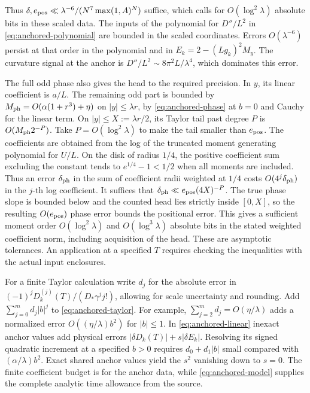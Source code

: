 Thus \(\delta,e_{\rm pos}\ll\lambda^{-6}/(N^7\max(1,A)^N)\) suffice,
which calls for \(O(\log^2\lambda)\) absolute bits in these scaled data.
The inputs of the polynomial for \(D''/L^2\) in
\eqref{eq:anchored-polynomial} are bounded in the scaled coordinates.
Errors \(O(\lambda^{-6})\) persist at that order in the polynomial and in
\(E_k=2-(Lg_k)^2M_y\). The curvature signal at the anchor is
\(D''/L^2\sim8\pi^2L/\lambda^4\), which dominates this error.

The full odd phase also gives the head to the required precision. In
\(y\), its linear coefficient is \(a/L\). The remaining odd part is bounded
by \(M_{\rm ph}=O(\alpha(1+r^3)+\eta)\) on \(|y|\le\lambda r\), by
\eqref{eq:anchored-phase} at \(b=0\) and Cauchy for the linear term.
On \(|y|\le X:=\lambda r/2\), its Taylor tail past degree \(P\) is
\(O(M_{\rm ph}2^{-P})\). Take \(P=O(\log^2\lambda)\) to make the tail
smaller than \(e_{\rm pos}\). The coefficients are obtained from the log
of the truncated moment generating polynomial for \(U/L\). On the disk
of radius \(1/4\), the positive coefficient sum excluding the constant
tends to \(e^{1/4}-1<1/2\) when all moments are included. Thus an error
\(\delta_{\rm ph}\) in the sum of coefficient radii weighted at \(1/4\)
costs \(O(4^j\delta_{\rm ph})\) in the \(j\)-th log coefficient. It suffices
that \(\delta_{\rm ph}\ll e_{\rm pos}(4X)^{-P}\). The true phase slope
is bounded below and the counted head lies strictly inside \([0,X]\), so
the resulting \(O(e_{\rm pos})\) phase error bounds the positional error.
This gives a sufficient moment order \(O(\log^2\lambda)\) and
\(O(\log^3\lambda)\) absolute bits in the stated weighted coefficient norm,
including acquisition of the head. These are asymptotic tolerances.
An application at a specified \(T\) requires checking the inequalities
with the actual input enclosures.

For a finite Taylor calculation write \(d_j\) for the absolute error
in \((-1)^j D_k^{(j)}(T)/(D_*\gamma^j j!)\), allowing for scale uncertainty
and rounding. Add \(\sum_{j=0}^m d_j|b|^j\) to \eqref{eq:anchored-taylor}.
For example, \(\sum_{j=2}^m d_j=O(\eta/\lambda)\) adds a normalized
error \(O((\eta/\lambda)b^2)\) for \(|b|\le1\).
In \eqref{eq:anchored-linear} inexact anchor values add physical errors
\(|\delta D_k(T)|+s|\delta E_k|\). Resolving its signed quadratic increment
at a specified \(b>0\) requires \(d_0+d_1|b|\) small compared with
\((\alpha/\lambda)b^2\). Exact shared anchor values yield the \(s^2\)
vanishing down to \(s=0\). The finite coefficient budget is for the
anchor data, while \eqref{eq:anchored-model} supplies the complete analytic
time allowance from the source.

